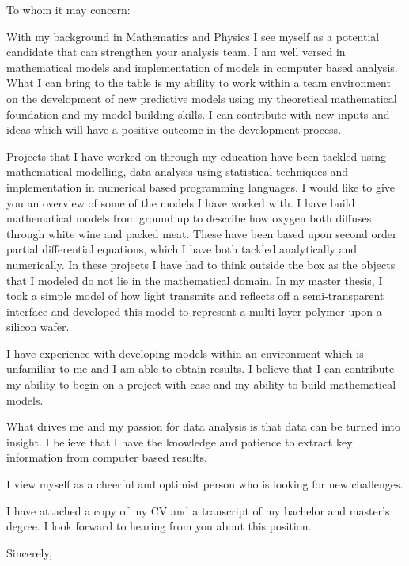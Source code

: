 \documentclass[10pt,a4paper]{letter}
\begin{document}
\begin{letter}{}
\opening{To whom it may concern:}

With my background in Mathematics and Physics I see myself as a potential candidate that can strengthen your analysis team. I am well versed in mathematical models and implementation of models in computer based analysis. What I can bring to the table is my ability to work within a team environment on the development of new predictive models using my theoretical mathematical foundation and my model building skills. I can contribute with new inputs and ideas which will have a positive outcome in the development process.

Projects that I have worked on through my education have been tackled using mathematical modelling, data analysis using statistical techniques and implementation in numerical based programming languages. I would like to give you an overview of some of the models I have worked with. I have build mathematical models from ground up to describe how oxygen both diffuses through white wine and packed meat. These have been based upon second order partial differential equations, which I have both tackled analytically and numerically. In these projects I have had to think outside the box as the objects that I modeled do not lie in the mathematical domain. In my master thesis, I took a simple model of how light transmits and reflects off a semi-transparent interface and developed this model to represent a multi-layer polymer upon a silicon wafer. 

I have experience with developing models within an environment which is unfamiliar to me and I am able to obtain results. I believe that I can contribute my ability to begin on a project with ease and my ability to build mathematical models. 

What drives me and my passion for data analysis is that data can be turned into insight. I believe that I have the knowledge and patience to extract key information from computer based results.      

I view myself as a cheerful and optimist person who is looking for new challenges.

I have attached a copy of my CV and a transcript of my bachelor and master's degree. I look forward to hearing from you about this position.   

\closing{Sincerely,}

\end{letter}

\end{document}
